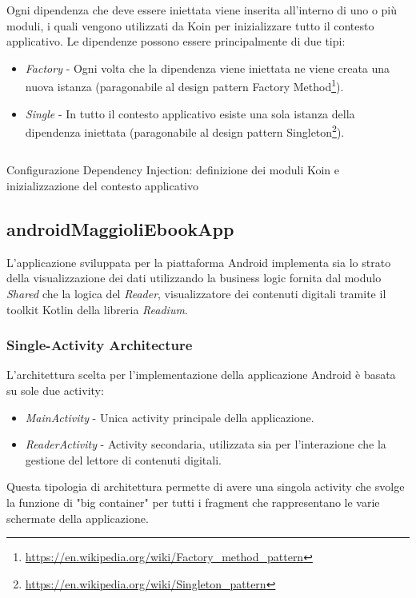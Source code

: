 Ogni dipendenza che deve essere iniettata viene inserita all'interno di uno o più moduli, i quali vengono utilizzati da Koin per inizializzare tutto il contesto applicativo. Le dipendenze possono essere principalmente di due tipi:
\begin{itemize}
    \item \textit{Factory} - Ogni volta che la dipendenza viene iniettata ne viene creata una nuova istanza (paragonabile al design pattern Factory Method\footnote{\url{https://en.wikipedia.org/wiki/Factory_method_pattern}}).
    \item \textit{Single} - In tutto il contesto applicativo esiste una sola istanza della dipendenza iniettata (paragonabile al design pattern Singleton\footnote{\url{https://en.wikipedia.org/wiki/Singleton_pattern}}).
\end{itemize}

\begin{listing}[H]
\inputminted{kotlin}{code/5-koin}
\caption{Configurazione Dependency Injection: definizione dei moduli Koin e inizializzazione del contesto applicativo}
\end{listing}

\subsection{androidMaggioliEbookApp}
L'applicazione sviluppata per la piattaforma Android implementa sia lo strato della visualizzazione dei dati utilizzando la business logic fornita dal modulo \textit{Shared} che la logica del \textit{Reader}, visualizzatore dei contenuti digitali tramite il toolkit Kotlin della libreria \textit{Readium}.
\subsubsection{Single-Activity Architecture}
L'architettura scelta per l'implementazione della applicazione Android è basata su sole due activity:
\begin{itemize}
    \item \textit{MainActivity} - Unica activity principale della applicazione.
    \item \textit{ReaderActivity} - Activity secondaria, utilizzata sia per l'interazione che la gestione del lettore di contenuti digitali.
\end{itemize}
Questa tipologia di architettura permette di avere una singola activity che svolge la funzione di "big container" per tutti i fragment che rappresentano le varie schermate della applicazione.

